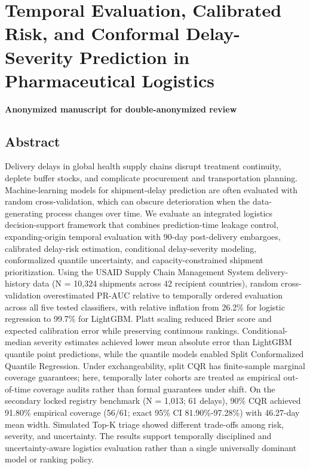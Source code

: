 \documentclass[
]{article}
\author{}
\date{}
\begin{document}
\section{Temporal Evaluation, Calibrated Risk, and Conformal
Delay-Severity Prediction in Pharmaceutical
Logistics}\label{temporal-evaluation-calibrated-risk-and-conformal-delay-severity-prediction-in-pharmaceutical-logistics}

\textbf{Anonymized manuscript for double-anonymized review}

\subsection{Abstract}\label{abstract}

Delivery delays in global health supply chains disrupt treatment
continuity, deplete buffer stocks, and complicate procurement and
transportation planning. Machine-learning models for shipment-delay
prediction are often evaluated with random cross-validation, which can
obscure deterioration when the data-generating process changes over
time. We evaluate an integrated logistics decision-support framework
that combines prediction-time leakage control, expanding-origin temporal
evaluation with 90-day post-delivery embargoes, calibrated delay-risk
estimation, conditional delay-severity modeling, conformalized quantile
uncertainty, and capacity-constrained shipment prioritization. Using the
USAID Supply Chain Management System delivery-history data (N = 10,324
shipments across 42 recipient countries), random cross-validation
overestimated PR-AUC relative to temporally ordered evaluation across
all five tested classifiers, with relative inflation from 26.2\% for
logistic regression to 99.7\% for LightGBM. Platt scaling reduced Brier
score and expected calibration error while preserving continuous
rankings. Conditional-median severity estimates achieved lower mean
absolute error than LightGBM quantile point predictions, while the
quantile models enabled Split Conformalized Quantile Regression. Under
exchangeability, split CQR has finite-sample marginal coverage
guarantees; here, temporally later cohorts are treated as empirical
out-of-time coverage audits rather than formal guarantees under shift.
On the secondary locked registry benchmark (N = 1,013; 61 delays), 90\%
CQR achieved 91.80\% empirical coverage (56/61; exact 95\% CI
81.90\%-97.28\%) with 46.27-day mean width. Simulated Top-K triage
showed different trade-offs among risk, severity, and uncertainty. The
results support temporally disciplined and uncertainty-aware logistics
evaluation rather than a single universally dominant model or ranking
policy.
\end{document}
